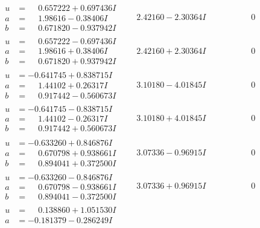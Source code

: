 \documentclass[1p]{elsarticle_modified}
\theoremstyle{definition}
\begin{document}
$$\begin{array}{c|c|c}
\begin{aligned}
u &= \phantom{-}0.657222 + 0.697436 I \\
a &= \phantom{-}1.98616 - 0.38406 I \\
b &= \phantom{-}0.671820 - 0.937942 I\end{aligned}
 & \phantom{-}2.42160 - 2.30364 I & \phantom{-0.000000 } 0 \\ \hline\begin{aligned}
u &= \phantom{-}0.657222 - 0.697436 I \\
a &= \phantom{-}1.98616 + 0.38406 I \\
b &= \phantom{-}0.671820 + 0.937942 I\end{aligned}
 & \phantom{-}2.42160 + 2.30364 I & \phantom{-0.000000 } 0 \\ \hline\begin{aligned}
u &= -0.641745 + 0.838715 I \\
a &= \phantom{-}1.44102 + 0.26317 I \\
b &= \phantom{-}0.917442 - 0.560673 I\end{aligned}
 & \phantom{-}3.10180 - 4.01845 I & \phantom{-0.000000 } 0 \\ \hline\begin{aligned}
u &= -0.641745 - 0.838715 I \\
a &= \phantom{-}1.44102 - 0.26317 I \\
b &= \phantom{-}0.917442 + 0.560673 I\end{aligned}
 & \phantom{-}3.10180 + 4.01845 I & \phantom{-0.000000 } 0 \\ \hline\begin{aligned}
u &= -0.633260 + 0.846876 I \\
a &= \phantom{-}0.670798 + 0.938661 I \\
b &= \phantom{-}0.894041 + 0.372500 I\end{aligned}
 & \phantom{-}3.07336 - 0.96915 I & \phantom{-0.000000 } 0 \\ \hline\begin{aligned}
u &= -0.633260 - 0.846876 I \\
a &= \phantom{-}0.670798 - 0.938661 I \\
b &= \phantom{-}0.894041 - 0.372500 I\end{aligned}
 & \phantom{-}3.07336 + 0.96915 I & \phantom{-0.000000 } 0 \\ \hline\begin{aligned}
u &= \phantom{-}0.138860 + 1.051530 I \\
a &= -0.181379 - 0.286249 I \\

\end{aligned}
\end{array}$$
\end{document}
